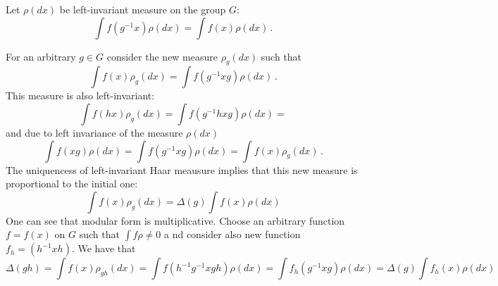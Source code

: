 
  Let  $\rho(dx)$ be left-invariant measure on the group $G$:
                    $$
        \int f(g^{-1}x)\rho(dx)=\int f(x)\rho(dx)\,.
                    $$

For an arbitrary $g\in G$ consider the new measure $\rho_g(dx)$ such
that
              $$
          \int f(x)\rho_g(dx)=\int f(g^{-1}xg)\rho(dx)\,.
              $$
This measure is also left-invariant:
             $$
\int f(hx)\rho_g(dx)=\int f(g^{-1}hxg)\rho(dx)=
             $$
and due to left invariance of the measure $\rho(dx)$
                 $$
\int f(xg)\rho (dx)=\int f(g^{-1}xg)\rho (dx)=\int f(x)\rho_g(dx)\,.
                 $$  
The uniquencess of left-invariant Haar meausure implies that
this new measure is proportional to the initial one:
             $$
      \int f(x)\rho_g(dx)=\Delta (g)\int f(x)\rho(dx)
             $$
One can see that modular form is multiplicative. Choose an arbitrary function
$f=f(x)$ on $G$ such that  $\int f \rho\not=0$ a
nd consider also new function $f_h=(h^{-1} x h)$. We have that
                  $$
\Delta(gh)=
 \int f(x)\rho _{gh}(dx)=
 \int f(h^{-1}g^{-1}xgh)\rho (dx)=\int f_h(g^{-1}xg)\rho (dx)=
   \Delta(g)\int f_h(x)\rho (dx)
                  $$         
\bye
